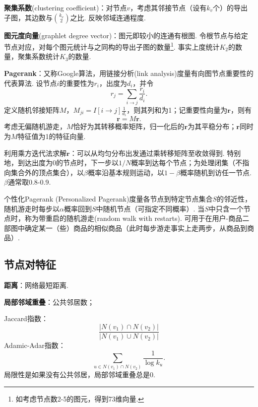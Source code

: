 \par \textbf{聚集系数}(clustering coefficient)：对节点$v$，考虑其邻接节点（设有$k_v$个）的导出子图，其边数与$\binom{k_v}{2}$之比. 反映邻域连通程度. 

\par \textbf{图元度向量}(graphlet degree vector)：图元即较小的连通有根图. 令根节点与给定节点对应，对每个图元统计与之同构的导出子图的数量\footnote{如考虑节点数2-5的图元，得到73维向量. }. 事实上度统计$K_2$的数量，聚集系数统计$K_3$的数量. 

\par \textbf{Pagerank}：又称Google算法，用链接分析(link analysis)度量有向图节点重要性的代表算法. 设节点$i$的重要性为$r_i$，出度为$d_i$，并令
\begin{equation}
    r_j=\sum_{i\to j}\frac{r_i}{d_i}.
\end{equation}
定义随机邻接矩阵$M$，$M_{ji}=I[i\to j] \frac{1}{d_i}$，则其列和为1；记重要性向量为$\mathbf{r}$，则有
\begin{equation}
    \mathbf{r}=M\mathbf{r}.
\end{equation}
考虑无偏随机游走，$M$恰好为其转移概率矩阵，归一化后的$\mathbf{r}$为其平稳分布；$\mathbf{r}$同时为$M$特征值为1的特征向量. 
\par 利用乘方迭代法求解$\mathbf{r}$：可以从均匀分布出发通过乘转移矩阵至收敛得到. 特别地，到达出度为0的节点时，下一步以$1/N$概率到达每个节点；为处理闭集（不指向集合外的顶点集合），以$\beta$概率沿基本规则运动，以$1-\beta$概率随机到访任一节点. $\beta$通常取0.8-0.9. 

\par 个性化Pagerank (Personalized Pagerank)度量各节点到特定节点集合$S$的邻近性，随机游走时每步以$\alpha$概率回到$S$中随机节点（可指定不同概率）. 当$S$中只含一个节点时，称为带重启的随机游走(random walk with restarts). 可用于在用户-商品二部图中确定某一（些）商品的相似商品（此时每步游走事实上走两步，从商品到商品）. 

\subsection{节点对特征}

\par \textbf{距离}：网络最短距离. 
\par \textbf{局部邻域重叠}：公共邻居数；
\par Jaccard指数：
\begin{equation}
    \frac{\vert N(v_1)\cap N(v_2)\vert}{\vert N(v_1)\cup N(v_2)\vert}
\end{equation}
Adamic-Adar指数：
\begin{equation}
    \sum_{u\in N(v_1)\cap N(v_2)} \frac{1}{\log k_u}.
\end{equation}
局限性是如果没有公共邻居，局部邻域重叠总是0.

